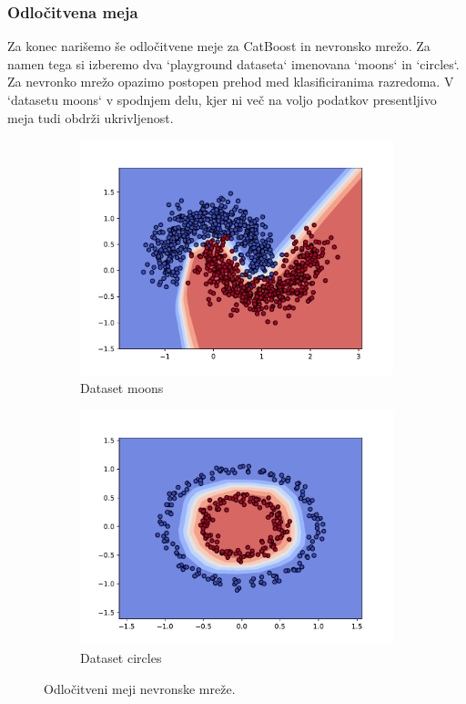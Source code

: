 \documentclass{article}
\begin{document}
\subsubsection{Odločitvena meja}
Za konec narišemo še odločitvene meje za CatBoost in nevronsko mrežo. Za namen tega si izberemo dva `playground dataseta` imenovana `moons` in `circles`. Za nevronko mrežo opazimo postopen prehod med klasificiranima razredoma. V `datasetu moons` v spodnjem delu, kjer ni več na voljo podatkov presentljivo meja tudi obdrži ukrivljenost. 
\begin{figure}[H]
    \centering
    \begin{subfigure}{0.48\textwidth}
        \centering
        \includegraphics[width=\linewidth]{moonsnn.pdf}
        \caption{Dataset moons}
    \end{subfigure}\hfill
    \begin{subfigure}{0.48\textwidth}
        \centering
        \includegraphics[width=\linewidth]{circlesnn.pdf}
        \caption{Dataset circles}
    \end{subfigure}
    \caption{Odločitveni meji nevronske mreže.}
\end{figure}
\end{document}
